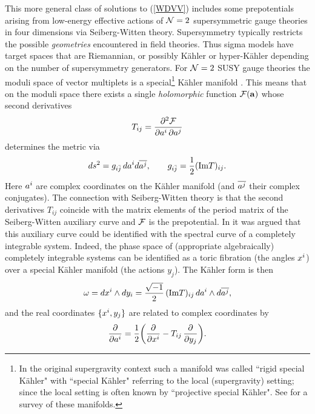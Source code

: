 \documentclass[a4paper,]{article}
\def\d{\partial}
\def\Im{{\rm Im}}
\def\N2{${\cal N}=2$}
\def\F{{\cal F}}
\begin{document}
This more general class of solutions to (\ref{WDVV}) includes
some prepotentials arising from 
low-energy effective actions of \N2 supersymmetric gauge theories in four 
dimensions via Seiberg-Witten theory.
Supersymmetry typically restricts the possible {\em geometries} encountered in
field theories. Thus sigma models have target spaces that
are Riemannian, or possibly K\"ahler or hyper-K\"ahler depending on 
the number of supersymmetry generators. 
For \N2 SUSY gauge theories the moduli space of vector multiplets 
is a special\footnote{
In the original supergravity context such a manifold was called
``rigid special K\"ahler" with ``special K\"ahler" referring to the
local (supergravity) setting; since \cite{Freed} the local setting is
often known by ``projective special K\"ahler". See \cite{cortes}
for a survey of these manifolds.}
K\"ahler manifold \cite{speKa,SW}.
This means that on the moduli space there exists a single {\em holomorphic} 
function $\F ({\bf a})$ whose second derivatives
\begin{equation}
\label{pematr}
T_{ij} =\dfrac{\d^2\F}{\d a\sp{i}\,\d a{\sp{j}}}
\end{equation}
determines the metric via
\begin{equation}
\label{metric}
ds\sp2= g_{i{\bar j}}\,d a\sp{i} d\overline{ a\sp{j}},\qquad
g_{i{\bar j}}=\dfrac{1}{2}(\Im T)_{ij}.
\end{equation}
Here $a\sp{i}$ are complex coordinates on the  K\"ahler manifold
(and $\overline{ a\sp{j}}$ their complex conjugates). The connection
with Seiberg-Witten theory is that the second derivatives $T_{ij}$ 
coincide with the matrix elements of the period matrix of the
Seiberg-Witten auxiliary curve and $\F$ is the prepotential.
In \cite{GKMMM} it was argued that this auxiliary curve could be identified
with the spectral curve of a completely integrable system. Indeed, the phase
space of (appropriate algebraically) completely integrable systems can
be identified as a toric fibration (the angles $x\sp{i}$) over a special 
K\"ahler manifold (the actions $y_j$). The K\"ahler form is then
\begin{equation}
\label{kform}
\omega=dx\sp{i}\wedge dy_i
=\dfrac{\sqrt{-1}}{2}\, (\Im T)_{ij}\, d a\sp{i}\wedge d\overline{ a\sp{j}},
\end{equation}
and the real coordinates $\{x\sp{i},y_j\}$ are related to complex coordinates by
\begin{equation*}
\dfrac{\d }{\d a\sp{i}}=\dfrac{1}{2}\bigg(\dfrac{\d }{\d x\sp{i}}
-T_{ij}\, \dfrac{\d }{\d y_{j}}\bigg).
\end{equation*}
\end{document}

